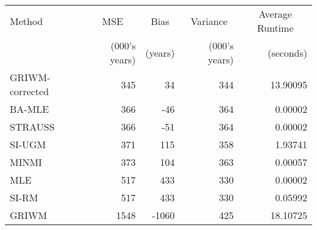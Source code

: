 
\begin{tabular}{lrrrr}
\toprule
\multicolumn{1}{l}{Method} & \multicolumn{1}{c}{MSE} & \multicolumn{1}{c}{Bias} & \multicolumn{1}{c}{Variance} & \multicolumn{1}{c}{Average Runtime} \\
 & (000's years) & (years) & (000's years) & (seconds)\\
\midrule
GRIWM-corrected & 345 & 34 & 344 & 13.90095\\
BA-MLE & 366 & -46 & 364 & 0.00002\\
STRAUSS & 366 & -51 & 364 & 0.00002\\
SI-UGM & 371 & 115 & 358 & 1.93741\\
MINMI & 373 & 104 & 363 & 0.00057\\
\addlinespace
MLE & 517 & 433 & 330 & 0.00002\\
SI-RM & 517 & 433 & 330 & 0.05992\\
GRIWM & 1548 & -1060 & 425 & 18.10725\\
\bottomrule
\end{tabular}
